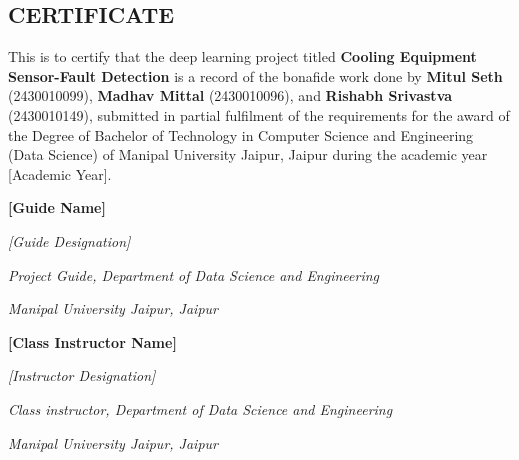 \begin{EditableCertificate}

\section*{CERTIFICATE}

This is to certify that the deep learning project titled
\textbf{Cooling Equipment Sensor-Fault Detection} is a record of the bonafide work done by
\textbf{Mitul Seth} (2430010099),
\textbf{Madhav Mittal} (2430010096), and
\textbf{Rishabh Srivastva} (2430010149), submitted in partial
fulfilment of the requirements for the award of the Degree of Bachelor
of Technology in Computer Science and Engineering (Data Science) of
Manipal University Jaipur, Jaipur during the academic year [Academic Year].

\vspace{42bp}

\begin{FacultyDetails}
\begin{flushleft}

\textbf{[Guide Name]}

\textit{[Guide Designation]}

\textit{Project Guide, Department of Data Science and Engineering}

\textit{Manipal University Jaipur, Jaipur}

\vspace{60bp}

\textbf{[Class Instructor Name]}

\textit{[Instructor Designation]}

\textit{Class instructor, Department of Data Science and Engineering}

\textit{Manipal University Jaipur, Jaipur}

\end{flushleft}
\end{FacultyDetails}
\end{EditableCertificate}
